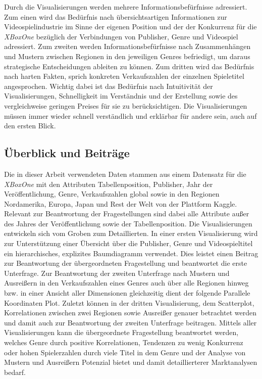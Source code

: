 \documentclass[usegeometry=true]{scrartcl}
\begin{document}
Durch die Visualisierungen werden mehrere Informationsbefürfnisse adressiert. 
Zum einen wird das Bedürfnis nach übersichtsartigen Informationen zur Videospielindustrie im Sinne der eigenen Position und der der Konkurrenz für die \textit{XBoxOne} bezüglich der Verbindungen von Publisher, Genre und Videospiel adressiert.
Zum zweiten werden Informationsbefürfnisse nach Zusammenhängen und Mustern zwischen Regionen in den jeweiligen Genres befriedigt, um daraus strategische Entscheidungen ableiten zu können.
Zum dritten wird das Bedürfnis nach harten Fakten, sprich konkreten Verkaufszahlen der einzelnen Spieletitel angesprochen.
Wichtig dabei ist das Bedürfnis nach Intuitivität der Visualisierungen, Schnelligkeit im Verständnis und der Erstellung sowie des vergleichweise geringen Preises für sie zu berücksichtigen. 
Die Visualisierungen müssen immer wieder schnell verständlich und erklärbar für andere sein, auch auf den ersten Blick.


\subsection{Überblick und Beiträge}
Die in dieser Arbeit verwendeten Daten stammen aus einem Datensatz für die \textit{XBoxOne} mit den Attributen Tabellenposition, Publisher, Jahr der Veröffentlichung, Genre, Verkaufszahlen global sowie in den Regionen Nordamerika, Europa, Japan und Rest der Welt von der Plattform Kaggle.\cite{SID_TWR.} 
Relevant zur Beantwortung der Fragestellungen sind dabei alle Attribute außer des Jahres der Veröffentlichung sowie der Tabellenposition. 
Die Visualisierungen entwickeln sich vom Groben zum Detaillierten.
In einer ersten Visualisierung wird zur Unterstützung einer Übersicht über die Publisher, Genre und Videospieltitel ein hierarchisches, explizites Baumdiagramm verwendet. 
Dies leistet einen Beitrag zur Beantwortung der übergeordneten Fragestellung und beantwortet die erste Unterfrage.
Zur Beantwortung der zweiten Unterfrage nach Mustern und Ausreißern in den Verkaufszahlen eines Genres auch über alle Regionen hinweg bzw. in einer Ansicht aller Dimensionen gleichzeitig dient der folgende Parallele Koordinaten Plot.
Zuletzt können in der dritten Visualisierung, dem Scatterplot, Korrelationen zwischen zwei Regionen sowie Ausreißer genauer betrachtet werden und damit auch zur Beantwortung der zweiten Unterfrage beitragen.
Mittels aller Visualisierungen kann die übergeordnete Fragestellung beantwortet werden, welches Genre durch positive Korrelationen, Tendenzen zu wenig Konkurrenz oder hohen Spielerzahlen durch viele Titel in dem Genre und der Analyse von Mustern und Ausreißern Potenzial bietet und damit detaillierterer Marktanalysen bedarf.
\end{document}
